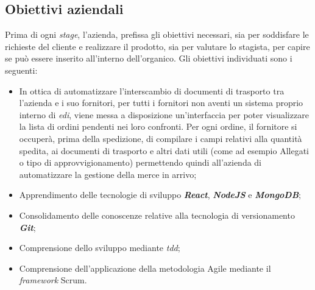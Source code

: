 \subsection{Obiettivi aziendali}
Prima di ogni \emph{stage}, l'azienda, prefissa gli obiettivi necessari, sia per soddisfare le richieste del cliente e realizzare il prodotto, sia per valutare lo stagista, per capire se può essere inserito all'interno dell'organico. 
Gli obiettivi individuati sono i seguenti:
\begin{itemize}
  \item In ottica di automatizzare l'interscambio di documenti di trasporto tra l'azienda e i suo fornitori, per tutti i fornitori non aventi un sistema proprio interno di \emph{\acrshort{edi}}, viene messa a disposizione un'interfaccia per poter visualizzare la lista di ordini pendenti nei loro confronti. Per ogni ordine, il fornitore si occuperà, prima della spedizione, di compilare i campi relativi alla quantità spedita, ai documenti di trasporto e altri dati utili (come ad esempio Allegati o tipo di approvvigionamento) permettendo quindi all'azienda di automatizzare la gestione della merce in arrivo;
  \item Apprendimento delle tecnologie di sviluppo \emph{\textbf{React}}, \emph{\textbf{NodeJS}} e \emph{\textbf{MongoDB}};
  \item Consolidamento delle conoscenze relative alla tecnologia di versionamento \emph{\textbf{Git}};
  \item Comprensione dello sviluppo mediante \emph{\acrshort{tdd}};
  \item Comprensione dell'applicazione della metodologia Agile mediante il \emph{framework} Scrum.
\end{itemize}

